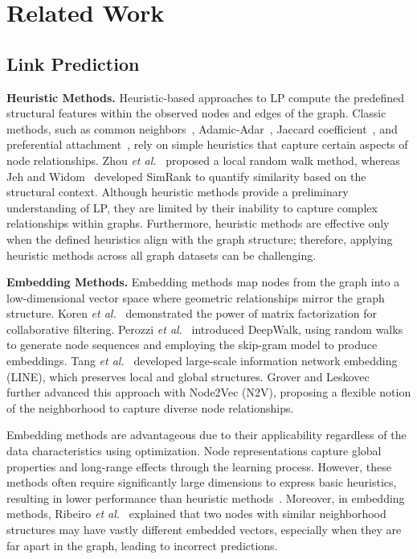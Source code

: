 \section{Related Work}\label{sec:related works}

\subsection{Link Prediction}

\noindent\textbf{Heuristic Methods.}
Heuristic-based approaches to LP compute the predefined structural features within the observed nodes and edges of the graph. 
Classic methods, such as common neighbors~\cite{adamic2003friends}, Adamic-Adar~\cite{adamic2003friends}, Jaccard coefficient~\cite{lu2011link}, and preferential attachment~\cite{barabasi1999emergence}, rely on simple heuristics that capture certain aspects of node relationships. 
Zhou \textit{et al.}~\cite{zhou2009predicting} proposed a local random walk method, whereas Jeh and Widom~\cite{jeh2002simrank} developed SimRank to quantify similarity based on the structural context. 
Although heuristic methods provide a preliminary understanding of LP, they are limited by their inability to capture complex relationships within graphs.
Furthermore, heuristic methods are effective only when the defined heuristics align with the graph structure; therefore, applying heuristic methods across all graph datasets can be challenging.


\noindent\textbf{Embedding Methods.}
Embedding methods map nodes from the graph into a low-dimensional vector space where geometric relationships mirror the graph structure. 
Koren \textit{et al.}~\cite{koren2009matrix} demonstrated the power of matrix factorization for collaborative filtering. 
Perozzi \textit{et al.}~\cite{perozzi2014deepwalk} introduced DeepWalk, using random walks to generate node sequences and employing the skip-gram model to produce embeddings. 
Tang \textit{et al.}~\cite{tang2015line} developed large-scale information network embedding (LINE), which preserves local and global structures. 
Grover and Leskovec~\cite{grover2016node2vec} further advanced this approach with Node2Vec (N2V), proposing a flexible notion of the neighborhood to capture diverse node relationships.

Embedding methods are advantageous due to their applicability regardless of the data characteristics using optimization. Node representations capture global properties and long-range effects through the learning process. However, these methods often require significantly large dimensions to express basic heuristics, resulting in lower performance than heuristic methods~\cite{nickel2014reducing}.
Moreover, in embedding methods, Ribeiro \textit{et al.}~\cite{ribeiro2017struc2vec} explained that two nodes with similar neighborhood structures may have vastly different embedded vectors, especially when they are far apart in the graph, leading to incorrect predictions.

